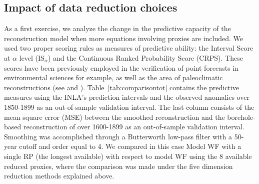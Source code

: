 \documentclass[12pt]{amsart}
\theoremstyle{plain}
\theoremstyle{definition}
\theoremstyle{remark}
\begin{document}
\subsection{Impact of data reduction choices}
As a first exercise, we analyze the change in the predictive capacity of the
reconstruction model when more equations involving proxies are included. We used
two proper scoring rules \cite{Gneiting2007a} as measures of predictive ability: the Interval Score at $\alpha$ level
(IS$_\alpha$) and the Continuous Ranked
Probability Score (CRPS). These scores have been previously employed in the
verification of point forecasts in environmental sciences for example, as well as the area
of paleoclimatic reconstructions (see \cite{Barboza2014} and
\cite{Scheuerer2014}). Table~\ref{tab:comparisontot} contains the predictive
measures using the INLA's prediction intervals and the observed
  anomalies over 1850-1899 as an out-of-sample validation interval. The
  last column consists of the mean square error (MSE) between the smoothed
  reconstruction and the borehole-based
reconstruction of \cite{Pollack2004} over 1600-1899 as an out-of-sample
validation interval. Smoothing was accomplished through a Butterworth low-pass filter with a 50-year cutoff and order equal to 4. We compared in this case Model WF with a single RP
(the longest available) with respect to model WF using the 8 available reduced
proxies, where the comparison was made under the five dimension reduction
methods explained above.
\end{document}
